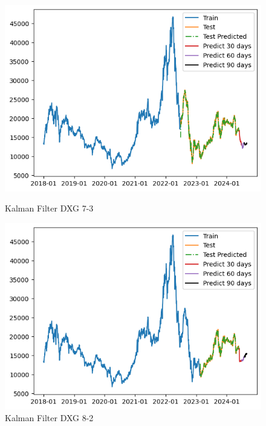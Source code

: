\documentclass[conference]{IEEEtran}
\begin{document}
\begin{enumerate}
\begin{figure}[htbp]
    \begin{minipage}{0.23\textwidth}
    \centering
    \includegraphics[width=1\textwidth]{experiment/kf/DXG 7-3.png}
    \caption{Kalman Filter DXG 7-3}
    \label{fig:nvl_boxplot}
    \end{minipage}
    \hfill
    \begin{minipage}{0.23\textwidth}
    \centering
    \includegraphics[width=1\textwidth]{experiment/kf/DXG 8-2.png}
    \caption{Kalman Filter DXG 8-2}
    \label{fig:nvl_histogram}
    \end{minipage}
    \begin{minipage}{0.23\textwidth}
    \centering

\end{minipage}
\end{figure}
\end{enumerate}
\end{document}
